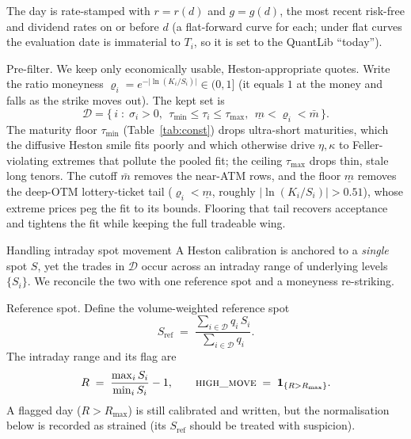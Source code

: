 \documentclass[a4paper, 11pt, reqno]{amsart}
\makeatletter
\def\section{\@startsection{section}{1}%
	\z@{.7\linespacing\@plus\linespacing}{.5\linespacing}%
	{\normalfont\bfseries\centering}}
\def\paragraph{\@startsection{paragraph}{4}%
	\z@\z@{-\fontdimen2\font}%
	{\normalfont\bfseries}}
\newcommand{\ConstMinMaturitySym}{\tau_{\min}}           \newcommand{\ConstMinMaturityVal}{14}
\newcommand{\ConstMaxMaturitySym}{\tau_{\max}}           \newcommand{\ConstMaxMaturityVal}{730}
\newcommand{\ConstOtmFloorSym}{\underline{m}}            \newcommand{\ConstOtmFloorVal}{0.6}
\newcommand{\ConstOtmCutoffSym}{\bar m}                  \newcommand{\ConstOtmCutoffVal}{0.98}
\newcommand{\ConstMaxMoveSym}{R_{\max}}                  \newcommand{\ConstMaxMoveVal}{0.03}
\makeatother
\begin{document}
		The day is rate-stamped with $r=r(d)$ and $g=g(d)$, the most recent risk-free and
		dividend rates on or before $d$ (a flat-forward curve for each; under flat curves the
		evaluation date is immaterial to $T_i$, so it is set to the QuantLib ``today'').
		
		\paragraph{Pre-filter.} We keep only economically usable, Heston-appropriate quotes. Write the
		ratio moneyness $\varrho_i = e^{-\lvert \ln(K_i/S_i)\rvert}\in(0,1]$ (it equals $1$ at the money
		and falls as the strike moves out). The kept set is
		\begin{equation}\label{eq:prefilter}
			\mathcal{D} = 
				\bigl\{\, i \;:\; \sigma_i > 0,\ \ \ConstMinMaturitySym \le \tau_i \le \ConstMaxMaturitySym,\ \
				\ConstOtmFloorSym < \varrho_i < \ConstOtmCutoffSym \,\bigr\}.
		\end{equation}
		The maturity floor $\ConstMinMaturitySym$ (Table~\ref{tab:const}) drops ultra-short maturities, which the
		diffusive Heston smile fits poorly and which otherwise drive $\eta,\kappa$ to Feller-violating
		extremes that pollute the pooled fit; the ceiling $\ConstMaxMaturitySym$ drops thin, stale long tenors.
		The cutoff $\ConstOtmCutoffSym$ removes the near-ATM
		rows, and the floor $\ConstOtmFloorSym$ removes the deep-OTM lottery-ticket tail
		($\varrho_i<\ConstOtmFloorSym$, roughly $\lvert\ln(K_i/S_i)\rvert>0.51$), whose extreme prices peg the
		fit to its bounds. Flooring that tail recovers acceptance and tightens the fit while keeping the
		full tradeable wing.
		
	\section{Handling intraday spot movement}\label{sec:spot}
		A Heston calibration is anchored to a \emph{single} spot $S$, yet the trades in
		$\mathcal{D}$ occur across an intraday range of underlying levels $\{S_i\}$. We reconcile
		the two with one reference spot and a moneyness re-striking.
		
		\paragraph{Reference spot.} Define the volume-weighted reference spot
		\begin{equation}\label{eq:sref}
			S_{\mathrm{ref}} \;=\; \frac{\sum_{i\in\mathcal{D}} q_i\, S_i}{\sum_{i\in\mathcal{D}} q_i}.
		\end{equation}
		The intraday range and its flag are
		\begin{equation}\label{eq:highmove}
			R \;=\; \frac{\max_{i} S_i}{\min_{i} S_i} - 1,
			\qquad
			\textsc{high\_move} \;=\; \mathbf{1}_{\{ R > \ConstMaxMoveSym \}}.
		\end{equation}
		A flagged day ($R>\ConstMaxMoveSym$) is still calibrated and written, but the normalisation below
		is recorded as strained (its $S_{\mathrm{ref}}$ should be treated with suspicion).
		
\end{document}
